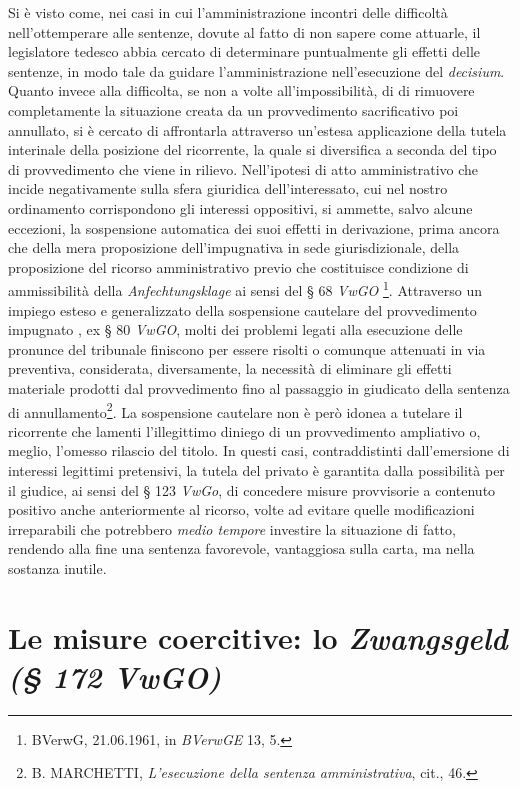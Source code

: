 \documentclass[12pt,it,a4paper,]{report}
\begin{document}
Si è visto come, nei casi in cui l'amministrazione incontri delle
difficoltà nell'ottemperare alle sentenze, dovute al fatto di non sapere
come attuarle, il legislatore tedesco abbia cercato di determinare
puntualmente gli effetti delle sentenze, in modo tale da guidare
l'amministrazione nell'esecuzione del \emph{decisium}. Quanto invece
alla difficolta, se non a volte all'impossibilità, di di rimuovere
completamente la situazione creata da un provvedimento sacrificativo poi
annullato, si è cercato di affrontarla attraverso un'estesa applicazione
della tutela interinale della posizione del ricorrente, la quale si
diversifica a seconda del tipo di provvedimento che viene in rilievo.
Nell'ipotesi di atto amministrativo che incide negativamente sulla sfera
giuridica dell'interessato, cui nel nostro ordinamento corrispondono gli
interessi oppositivi, si ammette, salvo alcune eccezioni, la sospensione
automatica dei suoi effetti in derivazione, prima ancora che della mera
proposizione dell'impugnativa in sede giurisdizionale, della
proposizione del ricorso amministrativo previo che costituisce
condizione di ammissibilità della \emph{Anfechtungsklage} ai sensi del §
68 \emph{VwGO} \footnote{BVerwG, 21.06.1961, in \emph{BVerwGE} 13, 5.}.
Attraverso un impiego esteso e generalizzato della sospensione cautelare
del provvedimento impugnato , ex § 80 \emph{VwGO}, molti dei problemi
legati alla esecuzione delle pronunce del tribunale finiscono per essere
risolti o comunque attenuati in via preventiva, considerata,
diversamente, la necessità di eliminare gli effetti materiale prodotti
dal provvedimento fino al passaggio in giudicato della sentenza di
annullamento\footnote{B. MARCHETTI, \emph{L'esecuzione della sentenza
  amministrativa}, cit., 46.}. La sospensione cautelare non è però
idonea a tutelare il ricorrente che lamenti l'illegittimo diniego di un
provvedimento ampliativo o, meglio, l'omesso rilascio del titolo. In
questi casi, contraddistinti dall'emersione di interessi legittimi
pretensivi, la tutela del privato è garantita dalla possibilità per il
giudice, ai sensi del § 123 \emph{VwGo}, di concedere misure provvisorie
a contenuto positivo anche anteriormente al ricorso, volte ad evitare
quelle modificazioni irreparabili che potrebbero \emph{medio tempore}
investire la situazione di fatto, rendendo alla fine una sentenza
favorevole, vantaggiosa sulla carta, ma nella sostanza inutile.

\hypertarget{le-misure-coercitive-lo-zwangsgeld-172-vwgo}{%
\section{\texorpdfstring{Le misure coercitive: lo \emph{Zwangsgeld (§
172
VwGO)}}{Le misure coercitive: lo Zwangsgeld (§ 172 VwGO)}}\label{le-misure-coercitive-lo-zwangsgeld-172-vwgo}}
\end{document}
